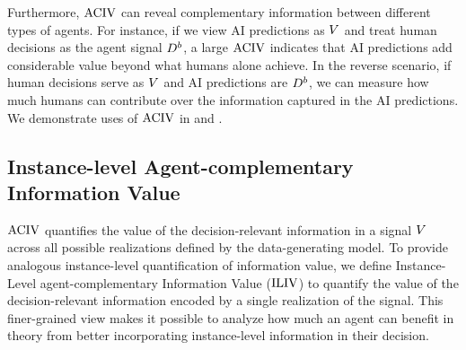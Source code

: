  \mvspace{-1mm}
Furthermore, $\operatorname{ACIV}$ can reveal complementary information between different types of agents. 
For instance, if we view AI predictions as $V$ and treat human decisions as the agent signal $D^b$, a large $\operatorname{ACIV}$ indicates that AI predictions add considerable value beyond what humans alone achieve. In the reverse scenario, if human decisions serve as $V$ and AI predictions are $D^b$, we can measure how much humans can contribute over the information captured in the AI predictions. We demonstrate uses of $\operatorname{ACIV}$ in  and .

 \mvspace{-2mm}
\subsection{Instance-level Agent-complementary Information Value}
 \mvspace{-2mm}
$\operatorname{ACIV}$ quantifies the value of the decision-relevant information in a signal $V$ across all possible realizations defined by the data-generating model.
To provide analogous instance-level quantification of information value, we define Instance-Level agent-complementary Information Value ($\operatorname{ILIV}$) to quantify the value of the decision-relevant information encoded by a single realization of the signal.
This finer-grained view makes it possible to analyze how much an agent can benefit in theory from better incorporating instance-level information in their decision.

